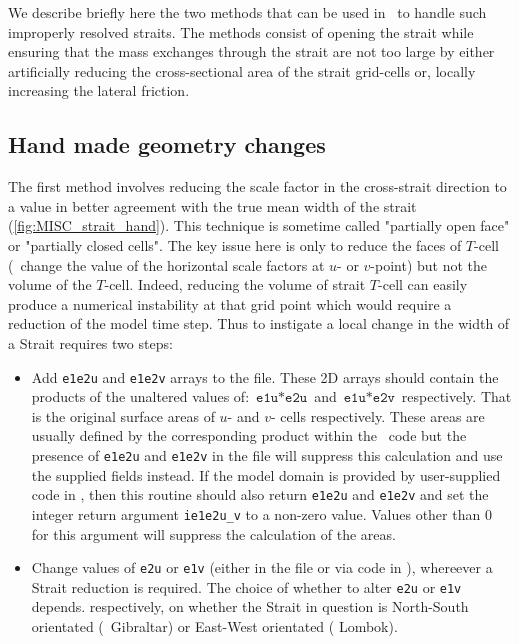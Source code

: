 \documentclass[../main/NEMO_manual]{subfiles}
\begin{document}
We describe briefly here the two methods that can be used in \NEMO\ to handle such
improperly resolved straits. The methods consist of opening the strait while ensuring
that the mass exchanges through the strait are not too large by either artificially
reducing the cross-sectional area of the strait grid-cells or, locally increasing the
lateral friction.

\subsection{Hand made geometry changes}
\label{subsec:MISC_strait_hand}

The first method involves reducing the scale factor in the cross-strait direction to a
value in better agreement with the true mean width of the strait
(\autoref{fig:MISC_strait_hand}).  This technique is sometime called "partially open face"
or "partially closed cells".  The key issue here is only to reduce the faces of $T$-cell
(\ie\ change the value of the horizontal scale factors at $u$- or $v$-point) but not the
volume of the $T$-cell.  Indeed, reducing the volume of strait $T$-cell can easily produce
a numerical instability at that grid point which would require a reduction of the model
time step.  Thus to instigate a local change in the width of a Strait requires two steps:

\begin{itemize}

\item Add \texttt{e1e2u} and \texttt{e1e2v} arrays to the  file. These 2D
arrays should contain the products of the unaltered values of: $\texttt{e1u}*\texttt{e2u}$
and $\texttt{e1u}*\texttt{e2v}$ respectively. That is the original surface areas of $u$-
and $v$- cells respectively.  These areas are usually defined by the corresponding product
within the \NEMO\ code but the presence of \texttt{e1e2u} and \texttt{e1e2v} in the
 file will suppress this calculation and use the supplied fields instead.
If the model domain is provided by user-supplied code in , then this
routine should also return \texttt{e1e2u} and \texttt{e1e2v} and set the integer return
argument \texttt{ie1e2u\_v} to a non-zero value. Values other than 0 for this argument
will suppress the calculation of the areas.

\item Change values of \texttt{e2u} or \texttt{e1v} (either in the  file or
via code in  ), whereever a Strait reduction is required. The choice of
whether to alter \texttt{e2u} or \texttt{e1v} depends. respectively,  on whether the
Strait in question is North-South orientated (\eg\ Gibraltar) or East-West orientated (\eg
Lombok).

\end{itemize}
\end{document}
